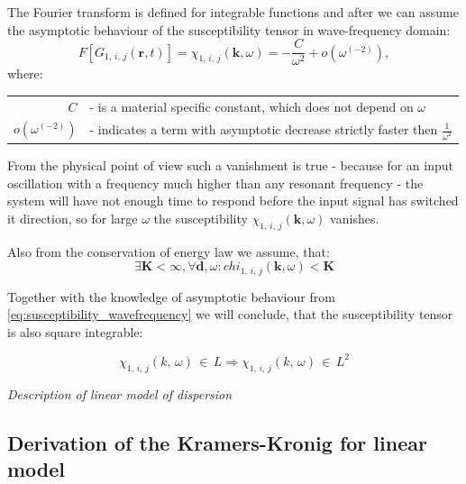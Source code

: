 \documentclass[12pt,twoside,a4paper]{article}
\numberwithin{equation}{subsection}
\numberwithin{figure}{subsection}
\begin{document}
The Fourier transform is defined for integrable functions and after \cite{muhoray_course,lucarini_kramers} we can assume the asymptotic
behaviour of the susceptibility tensor in wave-frequency domain:
\begin{equation} \label{eq:susceptibility_wavefrequency}
  F[ G_{1, \,i, \,j} (\textbf{r} ,t) ] = \chi_{1, \,i, \,j} (\textbf{k}, \omega ) = - \frac {C}{\omega ^{2}} + o(\omega ^{( - 2)}),
\end{equation}
where: 

\begin{tabular}{r l}
  $C$ & - is a material specific constant, which does not depend on $\omega $ \\
  $o(\omega ^{( - 2)})$ & - indicates a term with asymptotic decrease strictly faster then $\frac {1}{\omega ^{2}}$ \\
\end{tabular}


From the physical point of view such a vanishment is true - because for an input oscillation with a frequency much higher than any
resonant frequency - the system will have not enough time to respond before the input signal has switched it direction, so for large
$\omega $ the susceptibility ${\chi_{1, \,i, \,j}}(\textbf{k},\omega )$ vanishes.


Also from the conservation of energy law we assume, that:
\begin{equation} \label{eq:susceptibility_conservation}
  \exists \textbf{K} < \infty, \forall \textbf{d}, \omega : chi_{1, \,i, \,j}(\textbf{k}, \omega) < \textbf{K}
\end{equation}


Together with the knowledge of asymptotic behaviour from \ref{eq:susceptibility_wavefrequency} we will conclude, that the susceptibility
tensor is also square integrable:

\begin{equation} \label{eq:susceptibility_sqrintegrable}
  \chi_{1, \,i, \,j}(k, \,\omega ) \,\in \,L \Rightarrow \chi_{1, \,i, \,j} (k, \,\omega )\,\in\,L^{2}
\end{equation}


\textit{Description of linear model of dispersion}

\subsection{Derivation of the Kramers-Kronig for linear model} \label{chap:problem_dlin}
\end{document}
